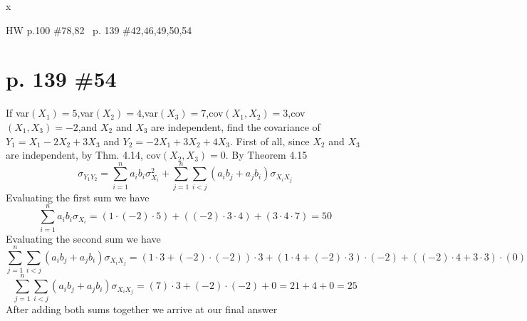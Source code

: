 x\documentclass[12pt]{article}
\begin{document}
\newpage
\maketitle HW p.100 \#78,82 \ p. 139 \#42,46,49,50,54
\section[20pt]{p. 139 \#54}
If var\((X_1)=5\),var\((X_2)=4\),var\((X_3)=7\),cov\((X_1,X_2)=3\),cov\((X_1,X_3)=-2\),and \(X_2\) and \(X_3\) are independent, find the covariance of \(Y_1=X_1-2X_2+3X_3\) and \(Y_2=-2X_1+3X_2+4X_3\). \newline
\newline
First of all, since \(X_2\) and \(X_3\) are independent, by Thm. 4.14, cov\((X_2,X_3)=0\). \newline
\newline
By Theorem 4.15
\[\sigma_{Y_1Y_2}=\sum_{i=1}^na_ib_i\sigma^2_{X_i}+\sum_{j=1}^n\sum_{i<j}(a_ib_j+a_jb_i)\sigma_{X_iX_j}\]
Evaluating the first sum we have
\[\sum_{i=1}^na_ib_i\sigma_{X_i}=(1\cdot(-2)\cdot5)+((-2)\cdot3\cdot4)+(3\cdot4\cdot7)=50\]
Evaluating the second sum we have
\[\sum_{j=1}^n\sum_{i<j}(a_ib_j+a_jb_i)\sigma_{X_iX_j}=(1\cdot3+(-2)\cdot(-2))\cdot3+(1\cdot4+(-2)\cdot3)\cdot(-2)+((-2)\cdot4+3\cdot3)\cdot(0)\]
\[\sum_{j=1}^n\sum_{i<j}(a_ib_j+a_jb_i)\sigma_{X_iX_j}=(7)\cdot3+(-2)\cdot(-2)+0=21+4+0=25\]
After adding both sums together we arrive at our final answer
\newline
{}
\end{document}
